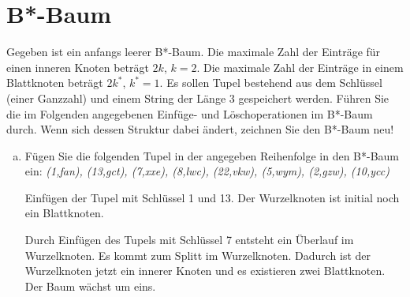 \section{B*-Baum}
\label{B*}

Gegeben ist ein anfangs leerer B*-Baum. Die maximale Zahl der Einträge für einen inneren Knoten beträgt $2k$, $k = 2$. Die maximale Zahl der Einträge in einem Blattknoten beträgt $2k^*$, $k^* = 1$. Es sollen Tupel bestehend aus dem Schlüssel (einer Ganzzahl) und einem String der Länge $3$ gespeichert werden. Führen Sie die im Folgenden angegebenen Einfüge- und Löschoperationen im B*-Baum durch. Wenn sich dessen Struktur dabei ändert, zeichnen Sie den B*-Baum neu!

\begin{enumerate}[a)]
  \item Fügen Sie die folgenden Tupel in der angegeben Reihenfolge in den B*-Baum ein: \textit{(1,fan), (13,gct), (7,xxe), (8,lwc), (22,vkw), (5,wym), (2,gzw), (10,ycc)}

	\begin{solution}
Einfügen der Tupel mit Schlüssel 1 und 13. Der Wurzelknoten ist initial noch ein Blattknoten.

	\begin{center}
  \end{center}

Durch Einfügen des Tupels mit Schlüssel 7 entsteht ein Überlauf im Wurzelknoten.
Es kommt zum Splitt im Wurzelknoten.
Dadurch ist der Wurzelknoten jetzt ein innerer Knoten und es existieren zwei Blattknoten.
Der Baum wächst um eins.

	\begin{center}
\end{center}
\end{solution}
\end{enumerate}
